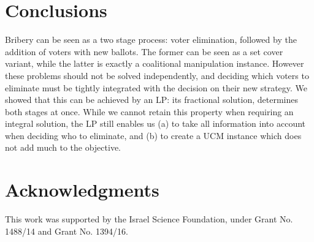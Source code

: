 \documentclass[letterpaper]{article} %
\theoremstyle{definition}
\begin{document}
\section{Conclusions}
Bribery can be seen as a two stage process: voter elimination, followed by the addition of voters with new ballots. The former can be seen as a set cover variant, while the latter is exactly a coalitional manipulation instance. However these problems should not be solved independently, and deciding which voters to eliminate must be tightly integrated with the decision on their new strategy. We showed that this can be achieved by an LP: its fractional solution, determines both stages at once. While we cannot retain this property when requiring an integral solution, the LP still enables us (a) to take all information into account when deciding who to eliminate, and (b) to create a UCM instance which does not add much to the objective.

\section{Acknowledgments}
	This work was supported by the Israel Science Foundation, under Grant No. 1488/14 and Grant No. 1394/16.





\clearpage

\end{document}
